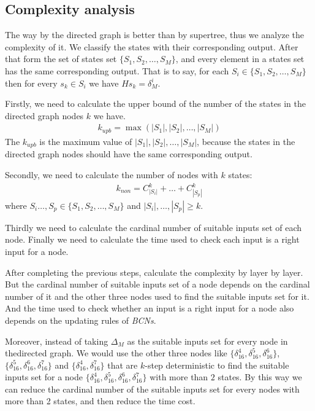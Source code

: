 \subsection{Complexity analysis}
The way by the directed graph is better than by supertree, thus we analyze the complexity of it. We classify the states with their corresponding output. After that form the set of states set $\{S_1, S_2,\ldots,S_M\}$,  and every element in a states set has the same corresponding output. That is to say, for each $S_i\in\{S_1, S_2,\ldots,S_M\}$ then for every $s_k\in S_i$ we have $Hs_k=\delta_{M}^i$.

Firstly, we need to calculate the upper bound of the number of the states in the directed graph nodes $k$ we have.
\begin{equation}
\begin{split}
k_{upb}= \max(|S_1|,|S_2|,\ldots,|S_M|)
\end{split}
\end{equation}
The $ k_{upb}$ is the maximum value of $|S_1|,|S_2|,\ldots,|S_M|$, because the states in the directed graph nodes should have the same corresponding output.

Secondly, we need to calculate the number of nodes with $k$ states:
\begin{equation}
\begin{split}
k_{non}= C_{|S_i|}^k+\ldots +C_{|S_p|}^k
\end{split}
\end{equation}
where $S_i\ldots,S_p\in\{S_1, S_2,\ldots,S_M\}$ and $|S_i|,\ldots,|S_p|\ge k$.

Thirdly we need to calculate the cardinal number of suitable inputs set of each node. Finally we need to calculate the time used to check each input is a right input for a node.

After completing the previous steps, calculate the complexity by layer by layer. But the cardinal number of suitable inputs set of a node depends on the cardinal number of it and the other three nodes used to find the suitable inputs set for it. And the time used to check whether an input is a right input for a node also depends on the updating rules of {\em BCNs}.

Moreover, instead of taking $\Delta_M$ as the suitable inputs set for every node in thedirected graph. We would use the other three nodes like $\{\delta_{16}^4,\delta_{16}^5,\delta_{16}^6\}$, $\{\delta_{16}^5,\delta_{16}^6,\delta_{16}^7\}$ and $\{\delta_{16}^4,\delta_{16}^7\}$ that are $k$-step deterministic to find the suitable inputs set for a node $\{\delta_{16}^4,\delta_{16}^5,\delta_{16}^6,\delta_{16}^7\}$ with more than $2$ states. By this way we can  reduce the cardinal number of the suitable inputs set for every nodes with more than 2 states, and then reduce the time cost. 

